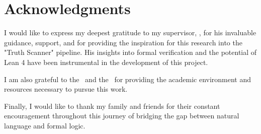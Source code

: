 \chapter*{Acknowledgments}

I would like to express my deepest gratitude to my supervisor, \supervisorName, for his invaluable guidance, support, and for providing the inspiration for this research into the "Truth Scanner" pipeline. His insights into formal verification and the potential of Lean 4 have been instrumental in the development of this project.

I am also grateful to the \university\ and the \faculty\ for providing the academic environment and resources necessary to pursue this work. 

Finally, I would like to thank my family and friends for their constant encouragement throughout this journey of bridging the gap between natural language and formal logic.